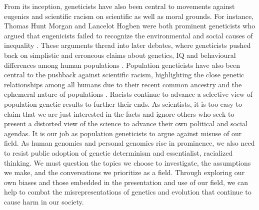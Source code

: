 From its inception, geneticists have also been central to movements against eugenics and scientific racism on scientific as well as moral grounds. For instance, Thomas Hunt Morgan and Lancelot Hogben were both prominent geneticists who argued that eugenicists failed to recognize the environmental and social causes of inequality \citep{hogben1933nature,tabery2008ra,allen2011eugenics}. These arguments thread into later debates, where geneticists pushed back on simplistic and erroneous claims about genetics, IQ and behavioural differences among human populations \citep{dobzhansky1961bogus,lewontin1970race,paul1994dobzhansky}. Population geneticists have also been central to the pushback against scientific racism, highlighting the close genetic relationships among all humans due to their recent common ancestry and the ephemeral nature of populations \citep{united1952race,lewontin1972apportionment,provine1986geneticists,gannett2013theodosius}. Racists continue to advance a selective view of population-genetic results to further their ends. As scientists, it is too easy to claim that we are just interested in the facts and ignore others who seek to present a distorted view of the science to advance their own political and social agendas. It is our job as population geneticists to argue against misuse of our field. As human genomics and personal genomics rise in prominence, we also need to resist public adoption of genetic determinism and essentialist, racialized thinking. We must question the topics we choose to investigate, the assumptions we make, and the conversations we prioritize as a field. Through exploring our own biases and those embedded in the presentation and use of our field, we can help to combat the misrepresentations of genetics and evolution that continue to cause harm in our society.
